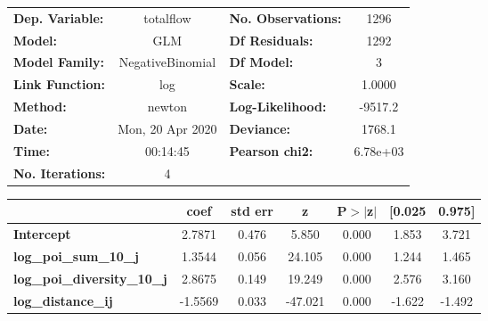 \begin{center}
\begin{tabular}{lclc}
\toprule
\textbf{Dep. Variable:}             &    totalflow     & \textbf{  No. Observations:  } &     1296    \\
\textbf{Model:}                     &       GLM        & \textbf{  Df Residuals:      } &     1292    \\
\textbf{Model Family:}              & NegativeBinomial & \textbf{  Df Model:          } &        3    \\
\textbf{Link Function:}             &       log        & \textbf{  Scale:             } &    1.0000   \\
\textbf{Method:}                    &      newton      & \textbf{  Log-Likelihood:    } &   -9517.2   \\
\textbf{Date:}                      & Mon, 20 Apr 2020 & \textbf{  Deviance:          } &    1768.1   \\
\textbf{Time:}                      &     00:14:45     & \textbf{  Pearson chi2:      } &  6.78e+03   \\
\textbf{No. Iterations:}            &        4         & \textbf{                     } &             \\
\bottomrule
\end{tabular}
\begin{tabular}{lcccccc}
                                    & \textbf{coef} & \textbf{std err} & \textbf{z} & \textbf{P$> |$z$|$} & \textbf{[0.025} & \textbf{0.975]}  \\
\midrule
\textbf{Intercept}                  &       2.7871  &        0.476     &     5.850  &         0.000        &        1.853    &        3.721     \\
\textbf{log\_poi\_sum\_10\_j}       &       1.3544  &        0.056     &    24.105  &         0.000        &        1.244    &        1.465     \\
\textbf{log\_poi\_diversity\_10\_j} &       2.8675  &        0.149     &    19.249  &         0.000        &        2.576    &        3.160     \\
\textbf{log\_distance\_ij}          &      -1.5569  &        0.033     &   -47.021  &         0.000        &       -1.622    &       -1.492     \\
\bottomrule
\end{tabular}
\end{center}